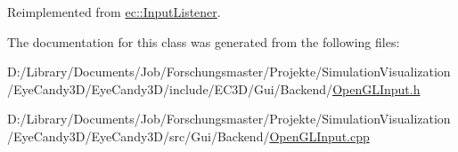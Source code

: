 Reimplemented from \mbox{\hyperlink{classec_1_1_input_listener_a9ceaefc79c6b0b260e88454616137840}{ec\+::\+Input\+Listener}}.



The documentation for this class was generated from the following files\+:\begin{DoxyCompactItemize}
\item 
D\+:/\+Library/\+Documents/\+Job/\+Forschungsmaster/\+Projekte/\+Simulation\+Visualization/\+Eye\+Candy3\+D/\+Eye\+Candy3\+D/include/\+E\+C3\+D/\+Gui/\+Backend/\mbox{\hyperlink{_open_g_l_input_8h}{Open\+G\+L\+Input.\+h}}\item 
D\+:/\+Library/\+Documents/\+Job/\+Forschungsmaster/\+Projekte/\+Simulation\+Visualization/\+Eye\+Candy3\+D/\+Eye\+Candy3\+D/src/\+Gui/\+Backend/\mbox{\hyperlink{_open_g_l_input_8cpp}{Open\+G\+L\+Input.\+cpp}}\end{DoxyCompactItemize}
